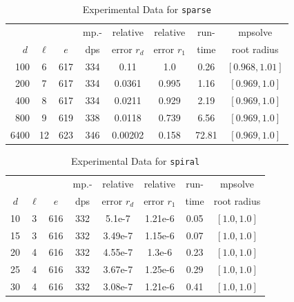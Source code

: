 \documentclass[runningheads]{llncs}
\begin{document}
\begin{table}
\caption{Experimental Data for \texttt{sparse}}
\label{tab:sparse}
\vskip -0.15in
\begin{center}
\begin{small}
\begin{sc}
\begin{tabular}{rccccccc}
\toprule
&  &  & mp.-& relative  & relative & run- & mpsolve \\
$d~$& $\ell$& $e$ & dps&error $r_d$       & error $r_1$ &time& root radius\\
\midrule
100 & 6 & 617 & 334 & 0.11 & 1.0 & 0.26 & $[0.968, 1.01]$\\
 200 & 7 & 617 & 334 & 0.0361 & 0.995 & 1.16 & $[0.969, 1.0]$\\
 400 & 8 & 617 & 334 & 0.0211 & 0.929 & 2.19 & $[0.969, 1.0]$\\
 800 & 9 & 619 & 338 & 0.0118 & 0.739 & 6.56 & $[0.969, 1.0]$\\
  6400 & 12 & 623 & 346 & 0.00202 & 0.158 & 72.81 & $[0.969, 1.0]$\\
\bottomrule
\end{tabular}
\end{sc}
\end{small}
\end{center}
\vskip 0.05in
\end{table}

\begin{table}
\caption{Experimental Data for \texttt{spiral}} %
\label{tab:spiral}
\vskip -0.15in
\begin{center}
\begin{small}
\begin{sc}
\begin{tabular}{rccccccc}
\toprule
&  &  & mp.-& relative  & relative & run- & mpsolve \\
$d~$& $\ell$& $e$ & dps&error $r_d$       & error $r_1$ &time& root radius\\
\midrule
 10 & 3 & 616 & 332 & 5.1e-7 & 1.21e-6 & 0.05 & $[1.0, 1.0]$\\
 15 & 3 & 616 & 332 & 3.49e-7 & 1.15e-6 & 0.07 & $[1.0, 1.0]$\\
 20 & 4 & 616 & 332 & 4.55e-7 & 1.3e-6 & 0.23 & $[1.0, 1.0]$\\
 25 & 4 & 616 & 332 & 3.67e-7 & 1.25e-6 & 0.29 & $[1.0, 1.0]$\\
 30 & 4 & 616 & 332 & 3.08e-7 & 1.21e-6 & 0.41 & $[1.0, 1.0]$\\
\bottomrule
\end{tabular}
\end{sc}
\end{small}
\end{center}
\vskip 0.05in
\end{table}
\end{document}
